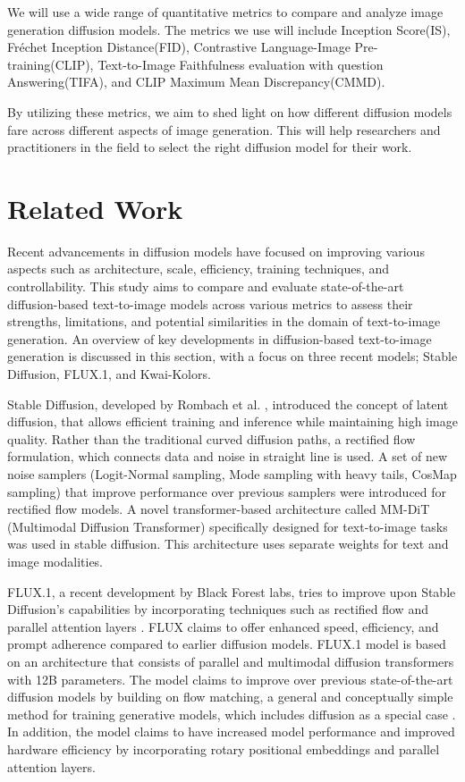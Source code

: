\documentclass{article}
\begin{document}
We will use a wide range of quantitative metrics to compare and analyze image generation diffusion models. 
The metrics we use will include Inception Score(IS), Fréchet Inception Distance(FID),
Contrastive Language-Image Pre-training(CLIP), Text-to-Image Faithfulness evaluation with question Answering(TIFA), and 
CLIP Maximum Mean Discrepancy(CMMD). 

By utilizing these metrics, we aim to shed light on how different diffusion models fare across different aspects
of image generation. This will help researchers and practitioners in the field to select the right diffusion model for their work. 



\section{Related Work}
Recent advancements in diffusion models have focused on improving various aspects such as 
architecture, scale, efficiency, training techniques, and controllability. This study aims to compare and evaluate state-of-the-art 
diffusion-based text-to-image models across various metrics to assess their strengths, limitations, and potential similarities in the 
domain of text-to-image generation. An overview of key developments in diffusion-based text-to-image generation is discussed in this section, 
with a focus on three recent models; Stable Diffusion, FLUX.1, and Kwai-Kolors.

Stable Diffusion, developed by Rombach et al. \cite{kulal2024stablediffusion}, introduced the concept of latent diffusion, that allows efficient training 
and inference while maintaining high image quality. Rather than the traditional curved diffusion paths, a rectified flow formulation, which connects data and noise in straight line is used. A set of new noise samplers (Logit-Normal sampling, Mode sampling 
with heavy tails, CosMap sampling) that improve performance over previous samplers were introduced for rectified flow models. 
A novel transformer-based architecture called MM-DiT (Multimodal Diffusion Transformer) specifically designed for text-to-image 
tasks was used in stable diffusion. This architecture uses separate weights for text and image modalities.

FLUX.1, a recent development by Black Forest labs, tries to improve upon Stable Diffusion's capabilities by incorporating techniques such as rectified flow and parallel attention layers \cite{flux2024medium}. FLUX claims to offer enhanced speed, efficiency, 
and prompt adherence compared to earlier diffusion models. FLUX.1 model is based on an architecture that consists of
parallel and multimodal diffusion transformers with 12B parameters. The model claims to improve over previous state-of-the-art diffusion 
models by building on flow matching, a general and conceptually simple method for training generative models, which includes 
diffusion as a special case \cite{flux2024main}. In addition, the model claims to have increased model performance and improved hardware efficiency by 
incorporating rotary positional embeddings and parallel attention layers.
\end{document}

